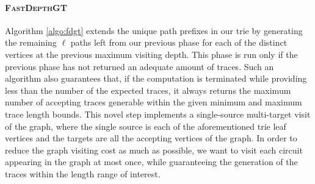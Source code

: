 \documentclass[sigconf]{acmart}
\begin{document}









\paragraph*{\textsc{FastDepthGT}}    Algorithm \ref{algo:fdgt} extends the unique path prefixes in our trie by generating the remaining $\ell$ paths left from our previous phase for each of the distinct vertices at the previous maximum visiting depth.
This phase  is run only if the previous phase has not returned an adequate amount of traces. Such an algorithm also guarantees that, if the computation is terminated while providing less than the number of the expected traces, it always returns the maximum number of accepting traces generable within the given minimum and maximum trace length bounds.
 This novel step implements a single-source multi-target visit of the graph, where the single source is each of the aforementioned trie leaf vertices and the targets are all the accepting vertices of the graph. In order to reduce the graph visiting cost as much as possible, we want to visit each circuit appearing in the graph at most once, while guaranteeing the generation of the traces within the length range of interest. 
\end{document}
